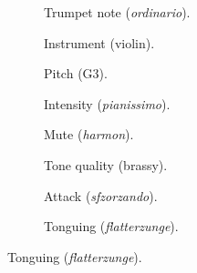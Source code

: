 \begin{figure}
        \newcommand{\scalwidth}{35.0mm}
        \newcommand{\scalheight}{27.7mm}
        \newcommand{\arrowextra}{2mm}

        \begin{subfigure}{0.25\textwidth}
                \centering
                \caption{Trumpet note (\emph{ordinario}).}
                \label{fig:TpC-ord-G4-mf_withaxes}
        \end{subfigure}%
        \begin{subfigure}{0.25\textwidth}
                \centering
                \caption{Instrument (violin).}
                \label{fig:Vn-ord-G4-mf-4c_withaxes}
        \end{subfigure}

        \vspace{3mm}

        \begin{subfigure}{0.25\textwidth}
                \centering
                \caption{Pitch (G3).}
                \label{fig:TpC-ord-G3-mf_withaxes}
        \end{subfigure}%
        \begin{subfigure}{0.25\textwidth}
                \centering
                \caption{Intensity (\emph{pianissimo}).}
                \label{fig:TpC-ord-G4-pp_withaxes}
        \end{subfigure}

        \vspace{3mm}

        \begin{subfigure}{0.25\textwidth}
                \centering
                \caption{Mute (\emph{harmon}).}
                \label{fig:TpC+H-ord-G4-mf_withaxes}
        \end{subfigure}%
        \begin{subfigure}{0.25\textwidth}
                \centering
                \caption{Tone quality (brassy).}
                \label{fig:TpC-brassy-G4-mf_withaxes}
        \end{subfigure}%

        \vspace{3mm}

        \begin{subfigure}{0.25\textwidth}
                \centering
                \caption{Attack (\emph{sfzorzando}).}
                \label{fig:TpC-sfz-G4-fp_withaxes}
        \end{subfigure}%
        \begin{subfigure}{0.25\textwidth}
                \centering
                \caption{Tonguing (\emph{flatterzunge}).}
                \label{fig:TpC-flatt-G4-mf_withaxes}
        \end{subfigure}


\end{figure}
